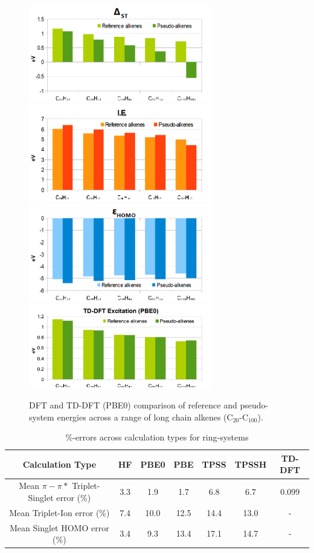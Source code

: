 \documentclass[journal=jctcce,manuscript=article]{achemso}
\begin{document}
\begin{figure}[h]
\includegraphics[width=8cm]{pbe0_excitation_long}
\includegraphics[width=8cm]{pbe0_ionisation_long}
\includegraphics[width=8cm]{pbe0_homo_long}
\includegraphics[width=8cm]{tddft_excitation_long}
\caption{DFT and TD-DFT (PBE0) comparison of reference and pseudo-system energies across a range of long chain alkenes (C\(_{20}\)-C\(_{100}\)).}
\label{fig:long_chain_graphs}
\end{figure}

\begin{table}[h]
\caption{\%-errors across calculation types for ring-systems}
\begin{tabular}{c c c c c c c}
\hline
Calculation Type & HF & PBE0 & PBE & TPSS & TPSSH & TD-DFT \\
\hline\hline
Mean \(\pi - \pi*\) Triplet-Singlet error (\%) & 3.3 & 1.9 & 1.7 & 6.8 & 6.7 & 0.099 \\
Mean Triplet-Ion error (\%) & 7.4 & 10.0 & 12.5 & 14.4 & 13.0 & - \\
Mean Singlet HOMO error (\%) & 3.4  & 9.3  & 13.4 & 17.1 & 14.7 & - \\
\hline
\end{tabular}
\label{table:ring_system_errors}
\end{table}
\end{document}
